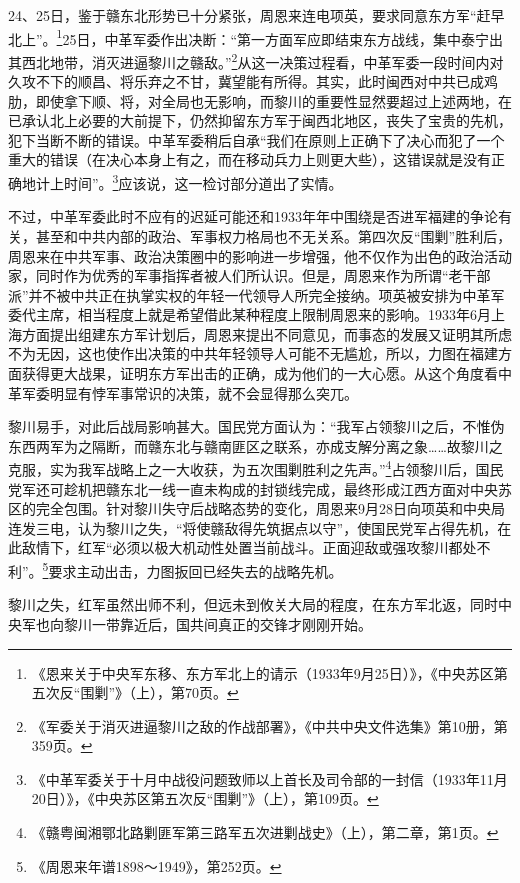 24、25日，鉴于赣东北形势已十分紧张，周恩来连电项英，要求同意东方军“赶早北上”。\footnote{《恩来关于中央军东移、东方军北上的请示（1933年9月25日）》，《中央苏区第五次反“围剿”》（上），第70页。}25日，中革军委作出决断：“第一方面军应即结束东方战线，集中泰宁出其西北地带，消灭进逼黎川之赣敌。”\footnote{《军委关于消灭进逼黎川之敌的作战部署》，《中共中央文件选集》第10册，第359页。}从这一决策过程看，中革军委一段时间内对久攻不下的顺昌、将乐弃之不甘，冀望能有所得。其实，此时闽西对中共已成鸡肋，即使拿下顺、将，对全局也无影响，而黎川的重要性显然要超过上述两地，在已承认北上必要的大前提下，仍然抑留东方军于闽西北地区，丧失了宝贵的先机，犯下当断不断的错误。中革军委稍后自承“我们在原则上正确下了决心而犯了一个重大的错误（在决心本身上有之，而在移动兵力上则更大些），这错误就是没有正确地计上时间”。\footnote{《中革军委关于十月中战役问题致师以上首长及司令部的一封信（1933年11月20日）》，《中央苏区第五次反“围剿”》（上），第109页。}应该说，这一检讨部分道出了实情。


不过，中革军委此时不应有的迟延可能还和1933年年中围绕是否进军福建的争论有关，甚至和中共内部的政治、军事权力格局也不无关系。第四次反“围剿”胜利后，周恩来在中共军事、政治决策圈中的影响进一步增强，他不仅作为出色的政治活动家，同时作为优秀的军事指挥者被人们所认识。但是，周恩来作为所谓“老干部派”并不被中共正在执掌实权的年轻一代领导人所完全接纳。项英被安排为中革军委代主席，相当程度上就是希望借此某种程度上限制周恩来的影响。1933年6月上海方面提出组建东方军计划后，周恩来提出不同意见，而事态的发展又证明其所虑不为无因，这也使作出决策的中共年轻领导人可能不无尴尬，所以，力图在福建方面获得更大战果，证明东方军出击的正确，成为他们的一大心愿。从这个角度看中革军委明显有悖军事常识的决策，就不会显得那么突兀。


黎川易手，对此后战局影响甚大。国民党方面认为：“我军占领黎川之后，不惟伪东西两军为之隔断，而赣东北与赣南匪区之联系，亦成支解分离之象……故黎川之克服，实为我军战略上之一大收获，为五次围剿胜利之先声。”\footnote{《赣粤闽湘鄂北路剿匪军第三路军五次进剿战史》（上），第二章，第1页。}占领黎川后，国民党军还可趁机把赣东北一线一直未构成的封锁线完成，最终形成江西方面对中央苏区的完全包围。针对黎川失守后战略态势的变化，周恩来9月28日向项英和中央局连发三电，认为黎川之失，“将使赣敌得先筑据点以守”，使国民党军占得先机，在此敌情下，红军“必须以极大机动性处置当前战斗。正面迎敌或强攻黎川都处不利”。\footnote{《周恩来年谱1898～1949》，第252页。}要求主动出击，力图扳回已经失去的战略先机。


黎川之失，红军虽然出师不利，但远未到攸关大局的程度，在东方军北返，同时中央军也向黎川一带靠近后，国共间真正的交锋才刚刚开始。


